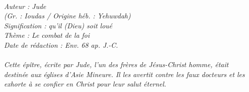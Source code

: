 \BFont
\noindent\hrulefill
{\footnotesize
\textit{
\bigskip
{\centering{}
\\Auteur : Jude
\\(Gr. : Ioudas / Origine héb. : Yehuwdah)
\\Signification : qu'il (Dieu) soit loué
\\Thème : Le combat de la foi
\\Date de rédaction : Env. 68 ap. J.-C.\\}
}
\textit{
\\Cette épître, écrite par Jude, l'un des frères de Jésus-Christ homme, était destinée aux églises d'Asie Mineure. Il les avertit contre les faux docteurs et les exhorte à se confier en Christ pour leur salut éternel.\bigskip
}
}
\par\nobreak\noindent\hrulefill

